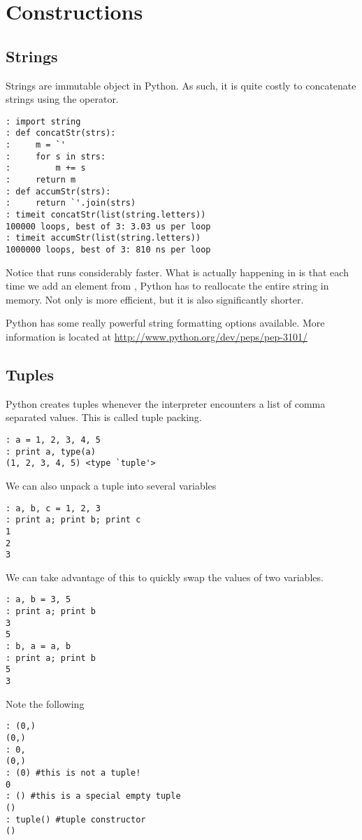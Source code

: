 \section*{Constructions}

\subsection*{Strings}
Strings are immutable object in Python.  As such, it is quite costly to concatenate strings using the \li{+} operator.
\begin{lstlisting}
: import string
: def concatStr(strs):
:     m = `'
:     for s in strs:
:         m += s
:     return m
: def accumStr(strs):
:     return `'.join(strs)
: timeit concatStr(list(string.letters))
100000 loops, best of 3: 3.03 us per loop
: timeit accumStr(list(string.letters))
1000000 loops, best of 3: 810 ns per loop
\end{lstlisting}
Notice that  runs considerably faster.  What is actually happening in  is that each time we add an element from , Python has to reallocate the entire string in memory.  Not only is  more efficient, but it is also significantly shorter.

Python has some really powerful string formatting options available.  More information is located at \url{http://www.python.org/dev/peps/pep-3101/}

\subsection*{Tuples}
Python creates tuples whenever the interpreter encounters a list of comma separated values.  This is called tuple packing.
\begin{lstlisting}
: a = 1, 2, 3, 4, 5
: print a, type(a)
(1, 2, 3, 4, 5) <type `tuple'>
\end{lstlisting}
We can also unpack a tuple into several variables
\begin{lstlisting}
: a, b, c = 1, 2, 3
: print a; print b; print c
1
2
3
\end{lstlisting}
We can take advantage of this to quickly swap the values of two variables.
\begin{lstlisting}
: a, b = 3, 5
: print a; print b
3
5
: b, a = a, b
: print a; print b
5
3
\end{lstlisting}
Note the following
\begin{lstlisting}
: (0,)
(0,)
: 0,
(0,)
: (0) #this is not a tuple!
0
: () #this is a special empty tuple
()
: tuple() #tuple constructor
()
\end{lstlisting}

